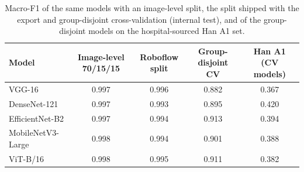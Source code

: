 \begin{table}[!tbp]
\centering
\caption{Macro-F1 of the same models with an image-level split, the split shipped with the export and group-disjoint cross-validation (internal test), and of the group-disjoint models on the hospital-sourced Han A1 set.}
\label{tab:leakage}
\footnotesize
\begin{tabular}{lcccc}
\hline
Model & Image-level 70/15/15 & Roboflow split & Group-disjoint CV & Han A1 (CV models) \\
\hline
VGG-16 & 0.997 & 0.996 & 0.882 & 0.367 \\
DenseNet-121 & 0.997 & 0.993 & 0.895 & 0.420 \\
EfficientNet-B2 & 0.997 & 0.994 & 0.913 & 0.394 \\
MobileNetV3-Large & 0.998 & 0.994 & 0.901 & 0.388 \\
ViT-B/16 & 0.998 & 0.995 & 0.911 & 0.382 \\
\hline
\end{tabular}
\end{table}